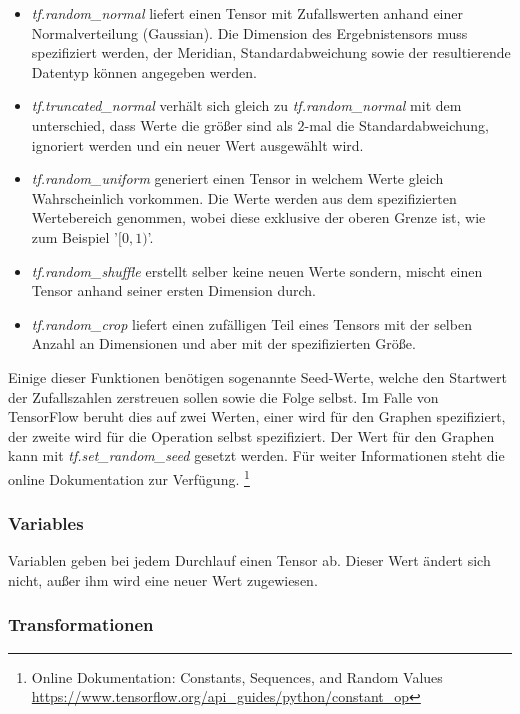 \begin{itemize}
	\item \textit{tf.random\_normal} liefert einen Tensor mit Zufallswerten anhand einer Normalverteilung (Gaussian). 
	Die Dimension des Ergebnistensors muss spezifiziert werden, der Meridian, Standardabweichung sowie der resultierende Datentyp können angegeben werden. 
	\item \textit{tf.truncated\_normal} verhält sich gleich zu \textit{tf.random\_normal} mit dem unterschied, dass Werte die größer sind als $2$-mal die Standardabweichung, ignoriert werden und ein neuer Wert ausgewählt wird.
	\item \textit{tf.random\_uniform} generiert einen Tensor in welchem Werte gleich Wahrscheinlich vorkommen.
	Die Werte werden aus dem spezifizierten Wertebereich genommen, wobei diese exklusive der oberen Grenze ist, wie zum Beispiel '$[0, 1)$'.
	\item \textit{tf.random\_shuffle} erstellt selber keine neuen Werte sondern, mischt einen Tensor anhand seiner ersten Dimension durch. 
	\item \textit{tf.random\_crop} liefert einen zufälligen Teil eines Tensors mit der selben Anzahl an Dimensionen und aber mit der spezifizierten Größe.
\end{itemize} \phantom \newline

\noindent
Einige dieser Funktionen benötigen sogenannte Seed-Werte, welche den Startwert der Zufallszahlen zerstreuen sollen sowie die Folge selbst. 
Im Falle von TensorFlow beruht dies auf zwei Werten, einer wird für den Graphen spezifiziert, der zweite wird für die Operation selbst spezifiziert. 
Der Wert für den Graphen kann mit \textit{tf.set\_random\_seed} gesetzt werden. 
Für weiter Informationen steht die online Dokumentation zur Verfügung. \footnote{Online Dokumentation: Constants, Sequences, and Random Values  \url{https://www.tensorflow.org/api_guides/python/constant_op}}

\subsubsection{Variables}

Variablen geben bei jedem Durchlauf einen Tensor ab.
Dieser Wert ändert sich nicht, außer ihm wird eine neuer Wert zugewiesen. 

\subsubsection{Transformationen}

